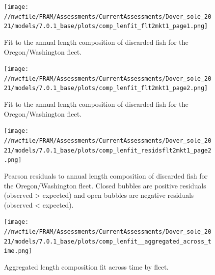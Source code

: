 \documentclass[11pt,
  english,
  a4paper,
]{article}
\begin{document}
\tagmcend\tagstructend


\begin{figure}
\centering
\texttt{[image: //nwcfile/FRAM/Assessments/CurrentAssessments/Dover\_sole\_2021/models/7.0.1\_base/plots/comp\_lenfit\_flt2mkt1\_page1.png]}
\caption{Fit to the annual length composition of discarded fish for the Oregon/Washington fleet.\label{fig:orwa-disc-len-fit-1}}
\end{figure}

\tagmcend\tagstructend


\begin{figure}
\centering
\texttt{[image: //nwcfile/FRAM/Assessments/CurrentAssessments/Dover\_sole\_2021/models/7.0.1\_base/plots/comp\_lenfit\_flt2mkt1\_page2.png]}
\caption{Fit to the annual length composition of discarded fish for the Oregon/Washington fleet.\label{fig:orwa-disc-len-fit-2}}
\end{figure}

\tagmcend\tagstructend


\begin{figure}
\centering
\texttt{[image: //nwcfile/FRAM/Assessments/CurrentAssessments/Dover\_sole\_2021/models/7.0.1\_base/plots/comp\_lenfit\_residsflt2mkt1\_page2.png]}
\caption{Pearson residuals to annual length composition of discarded fish for the Oregon/Washington fleet. Closed bubbles are positive residuals (observed \textgreater{} expected) and open bubbles are negative residuals (observed \textless{} expected).\label{fig:orwa-disc-pearson}}
\end{figure}

\tagmcend\tagstructend


\begin{figure}
\centering
\texttt{[image: //nwcfile/FRAM/Assessments/CurrentAssessments/Dover\_sole\_2021/models/7.0.1\_base/plots/comp\_lenfit\_\_aggregated\_across\_time.png]}
\caption{Aggregated length composition fit across time by fleet.\label{fig:agg-fits}}
\end{figure}
\end{document}
